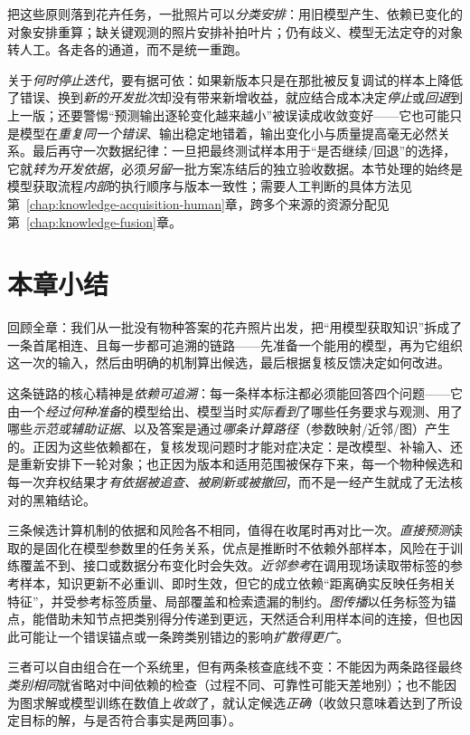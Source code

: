 把这些原则落到花卉任务，一批照片可以\emph{分类安排}：用旧模型产生、依赖已变化的对象安排重算；缺关键观测的照片安排补拍叶片；仍有歧义、模型无法定夺的对象转人工。各走各的通道，而不是统一重跑。

关于\emph{何时停止迭代}，要有据可依：如果新版本只是在那批被反复调试的样本上降低了错误、换到\emph{新的开发批次}却没有带来新增收益，就应结合成本决定\emph{停止}或\emph{回退}到上一版；还要警惕“预测输出逐轮变化越来越小”被误读成收敛变好——它也可能只是模型在\emph{重复同一个错误}、输出稳定地错着，输出变化小与质量提高毫无必然关系。最后再守一次数据纪律：一旦把最终测试样本用于“是否继续/回退”的选择，它就\emph{转为开发依据}，必须\emph{另留}一批方案冻结后的独立验收数据。本节处理的始终是模型获取流程\emph{内部}的执行顺序与版本一致性；需要人工判断的具体方法见第~\ref{chap:knowledge-acquisition-human}章，跨多个来源的资源分配见第~\ref{chap:knowledge-fusion}章。

\section{本章小结}
\label{sec:knowledge-acquisition-model-based-summary}

回顾全章：我们从一批没有物种答案的花卉照片出发，把“用模型获取知识”拆成了一条首尾相连、且每一步都可追溯的链路——先准备一个能用的模型，再为它组织这一次的输入，然后由明确的机制算出候选，最后根据复核反馈决定如何改进。

这条链路的核心精神是\emph{依赖可追溯}：每一条样本标注都必须能回答四个问题——它由一个\emph{经过何种准备}的模型给出、模型当时\emph{实际看到}了哪些任务要求与观测、用了哪些\emph{示范或辅助证据}、以及答案是通过\emph{哪条计算路径}（参数映射/近邻/图）产生的。正因为这些依赖都在，复核发现问题时才能对症决定：是改模型、补输入、还是重新安排下一轮对象；也正因为版本和适用范围被保存下来，每一个物种候选和每一次弃权结果才\emph{有依据被追查、被刷新或被撤回}，而不是一经产生就成了无法核对的黑箱结论。

三条候选计算机制的依据和风险各不相同，值得在收尾时再对比一次。\emph{直接预测}读取的是固化在模型参数里的任务关系，优点是推断时不依赖外部样本，风险在于训练覆盖不到、接口或数据分布变化时会失效。\emph{近邻参考}在调用现场读取带标签的参考样本，知识更新不必重训、即时生效，但它的成立依赖“距离确实反映任务相关特征”，并受参考标签质量、局部覆盖和检索遗漏的制约。\emph{图传播}以任务标签为锚点，能借助未知节点把类别得分传递到更远，天然适合利用样本间的连接，但也因此可能让一个错误锚点或一条跨类别错边的影响\emph{扩散得更广}。

三者可以自由组合在一个系统里，但有两条核查底线不变：不能因为两条路径最终\emph{类别相同}就省略对中间依赖的检查（过程不同、可靠性可能天差地别）；也不能因为图求解或模型训练在数值上\emph{收敛}了，就认定候选\emph{正确}（收敛只意味着达到了所设定目标的解，与是否符合事实是两回事）。

